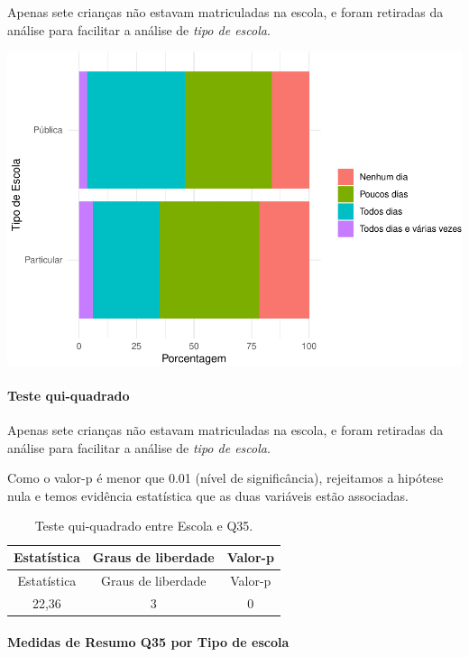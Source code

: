 \documentclass[]{article}
\let\oldparagraph\paragraph
\renewcommand{\paragraph}[1]{\oldparagraph{#1}\mbox{}}
\begin{document}
Apenas sete crianças não estavam matriculadas na escola, e foram retiradas da análise para facilitar a análise de \emph{tipo de escola}.

\begin{center}\includegraphics[width=0.75\linewidth]{relatorio_covid19_files/figure-latex/unnamed-chunk-1293-1} \end{center}

\hypertarget{teste-qui-quadrado-111}{%
\paragraph{Teste qui-quadrado}\label{teste-qui-quadrado-111}}

Apenas sete crianças não estavam matriculadas na escola, e foram retiradas da análise para facilitar a análise de \emph{tipo de escola}.

Como o valor-p é menor que 0.01 (nível de significância), rejeitamos a hipótese nula e temos evidência estatística que as duas variáveis estão associadas.

\begin{longtable}[]{@{}ccc@{}}
\caption{\label{tab:unnamed-chunk-1295}Teste qui-quadrado entre Escola e Q35.}\tabularnewline
\toprule
Estatística & Graus de liberdade & Valor-p\tabularnewline
\midrule
\endfirsthead
\toprule
Estatística & Graus de liberdade & Valor-p\tabularnewline
\midrule
\endhead
22,36 & 3 & 0\tabularnewline
\bottomrule
\end{longtable}

\cleardoublepage

\hypertarget{medidas-de-resumo-q35-por-tipo-de-escola}{%
\paragraph{Medidas de Resumo Q35 por Tipo de escola}\label{medidas-de-resumo-q35-por-tipo-de-escola}}
\end{document}
